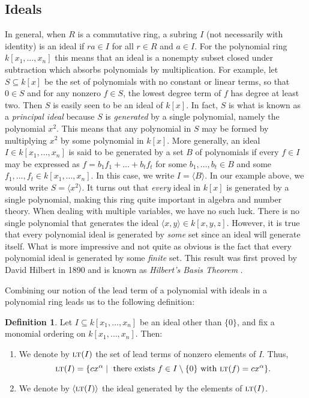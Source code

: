 \documentclass[MS, xcolor=dvipsnames]{wfuthesis}
\def\sbs{\subseteq}
\newcommand{\LT}{\ensuremath{\text{\sc lt}}}
\theoremstyle{definition}
\newtheorem{definition}[theorem]{Definition}
\begin{document}
\subsection{Ideals}
In general, when $R$ is a commutative ring, a subring $I$ (not necessarily with identity) is an ideal if $ra \in I$ for all $r \in R$ and $a \in I$. For the polynomial ring $k[x_1,\dots,x_n]$ this means that an ideal is a nonempty subset closed under subtraction which absorbs polynomials by multiplication. For example, let $S \sbs k[x]$ be the set of polynomials with no constant or linear terms, so that $0 \in S$ and for any nonzero $f \in S$, the lowest degree term of $f$ has degree at least two. Then $S$ is easily seen to be an ideal of $k[x]$. In fact, $S$ is what is known as a \textit{principal ideal} because $S$ is \textit{generated} by a single polynomial, namely the polynomial $x^2$. This means that any polynomial in $S$ may be formed by multiplying $x^2$ by some polynomial in $k[x]$. More generally, an ideal $I \in k[x_1,\dots,x_n]$ is said to be generated by a set $B$ of polynomials if every $f \in I$ may be expressed as $f = b_1f_1 + \dots + b_tf_t$ for some $b_1,\dots,b_t \in B$ and some $f_1,\dots,f_t \in k[x_1,\dots,x_n]$. In this case, we write $I = \langle B \rangle$. In our example above, we would write $S = \langle x^2 \rangle$. It turns out that \textit{every} ideal in $k[x]$ is generated by a single polynomial, making this ring quite important in algebra and number theory. When dealing with multiple variables, we have no such luck. There is no single polynomial that generates the ideal $\langle x,y \rangle \in k[x,y,z]$. However, it is true that every polynomial ideal is generated by \textit{some} set since an ideal will generate itself. What is more impressive and not quite as obvious is the fact that every polynomial ideal is generated by some \textit{finite} set. This result was first proved by David Hilbert in 1890 and is known as \textit{Hilbert's Basis Theorem} \cite{Hilbert1890}. \par
Combining our notion of the lead term of a polynomial with ideals in a polynomial ring leads us to the following definition:
\begin{definition}
  Let $I \sbs k[x_1,\dots,x_n]$ be an ideal other than $\{0\}$, and fix a monomial ordering on $k[x_1,\dots,x_n]$. Then:
  \begin{enumerate}[label=(\roman*)]
    \item We denote by $\LT(I)$ the set of lead terms of nonzero elements of $I$. Thus,
    \[ \LT(I) = \{ cx^\alpha \mid \text{ there exists } f \in I \setminus \{0\} \text{ with } \LT(f) = cx^\alpha \}. \]
    \item We denote by $\langle \LT(I) \rangle$ the ideal generated by the elements of $\LT(I)$.
  \end{enumerate}
\end{definition}
\end{document}
